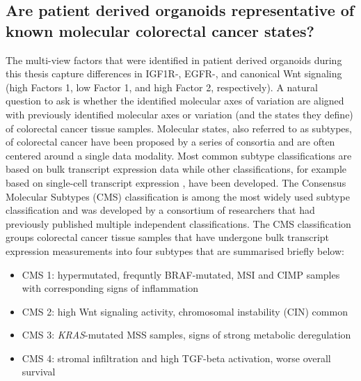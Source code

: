 \begin{flushleft}
\clearpage
\subsection{Are patient derived organoids representative of known molecular colorectal cancer states?}

The multi-view factors that were identified in patient derived organoids during this thesis capture differences in IGF1R-, EGFR-, and canonical Wnt signaling (high Factors 1, low Factor 1, and high Factor 2, respectively). A natural question to ask is whether the identified molecular axes of variation are aligned with previously identified molecular axes or variation (and the states they define) of colorectal cancer tissue samples. Molecular states, also referred to as subtypes, of colorectal cancer have been proposed by a series of consortia and are often centered around a single data modality. Most common subtype classifications are based on bulk transcript expression data \parencite{guinneyConsensusMolecularSubtypes2015} while other classifications, for example based on single-cell transcript expression \parencite{joanitoSinglecellBulkTranscriptome2022}, have been developed. The Consensus Molecular Subtypes (CMS) classification \parencite{guinneyConsensusMolecularSubtypes2015} is among the most widely used subtype classification and was developed by a consortium of researchers that had previously published multiple independent classifications. The CMS classification groups colorectal cancer tissue samples that have undergone bulk transcript expression measurements into four subtypes that are summarised briefly below:

\begin{itemize} 
    \item CMS 1: hypermutated, frequntly BRAF-mutated, MSI and CIMP samples with corresponding signs of inflammation
    \item CMS 2: high Wnt signaling activity, chromosomal instability (CIN) common
    \item CMS 3: \textit{KRAS}-mutated MSS samples, signs of strong metabolic deregulation
    \item CMS 4: stromal infiltration and high TGF-beta activation, worse overall survival
\end{itemize}


\end{flushleft}
